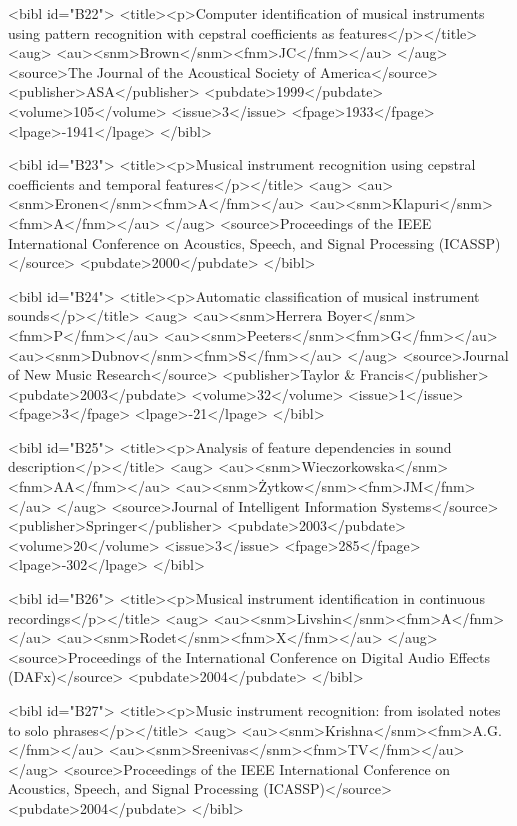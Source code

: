 \documentclass{bmcart}
\begin{document}
\begin{backmatter}
{<bibl id="B22">
  <title><p>Computer identification of musical instruments using pattern
  recognition with cepstral coefficients as features</p></title>
  <aug>
    <au><snm>Brown</snm><fnm>JC</fnm></au>
  </aug>
  <source>The Journal of the Acoustical Society of America</source>
  <publisher>ASA</publisher>
  <pubdate>1999</pubdate>
  <volume>105</volume>
  <issue>3</issue>
  <fpage>1933</fpage>
  <lpage>-1941</lpage>
</bibl>

<bibl id="B23">
  <title><p>Musical instrument recognition using cepstral coefficients and
  temporal features</p></title>
  <aug>
    <au><snm>Eronen</snm><fnm>A</fnm></au>
    <au><snm>Klapuri</snm><fnm>A</fnm></au>
  </aug>
  <source>Proceedings of the IEEE International Conference on Acoustics,
  Speech, and Signal Processing (ICASSP)</source>
  <pubdate>2000</pubdate>
</bibl>

<bibl id="B24">
  <title><p>Automatic classification of musical instrument sounds</p></title>
  <aug>
    <au><snm>Herrera Boyer</snm><fnm>P</fnm></au>
    <au><snm>Peeters</snm><fnm>G</fnm></au>
    <au><snm>Dubnov</snm><fnm>S</fnm></au>
  </aug>
  <source>Journal of New Music Research</source>
  <publisher>Taylor \& Francis</publisher>
  <pubdate>2003</pubdate>
  <volume>32</volume>
  <issue>1</issue>
  <fpage>3</fpage>
  <lpage>-21</lpage>
</bibl>

<bibl id="B25">
  <title><p>Analysis of feature dependencies in sound description</p></title>
  <aug>
    <au><snm>Wieczorkowska</snm><fnm>AA</fnm></au>
    <au><snm>{\.Z}ytkow</snm><fnm>JM</fnm></au>
  </aug>
  <source>Journal of Intelligent Information Systems</source>
  <publisher>Springer</publisher>
  <pubdate>2003</pubdate>
  <volume>20</volume>
  <issue>3</issue>
  <fpage>285</fpage>
  <lpage>-302</lpage>
</bibl>

<bibl id="B26">
  <title><p>Musical instrument identification in continuous
  recordings</p></title>
  <aug>
    <au><snm>Livshin</snm><fnm>A</fnm></au>
    <au><snm>Rodet</snm><fnm>X</fnm></au>
  </aug>
  <source>Proceedings of the International Conference on Digital Audio Effects
  (DAFx)</source>
  <pubdate>2004</pubdate>
</bibl>

<bibl id="B27">
  <title><p>Music instrument recognition: from isolated notes to solo
  phrases</p></title>
  <aug>
    <au><snm>Krishna</snm><fnm>A.G.</fnm></au>
    <au><snm>Sreenivas</snm><fnm>TV</fnm></au>
  </aug>
  <source>Proceedings of the IEEE International Conference on Acoustics,
  Speech, and Signal Processing (ICASSP)</source>
  <pubdate>2004</pubdate>
</bibl>

}
\end{backmatter}
\end{document}
